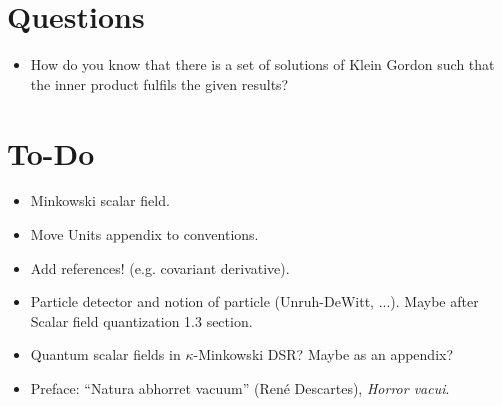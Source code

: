 \section{Questions}
\begin{itemize}
	\item How do you know that there is a set of solutions of Klein Gordon such that the inner product fulfils the given results?
\end{itemize}
\section{To-Do}
\begin{itemize}
	\item Minkowski scalar field.
	\item Move Units appendix to conventions.
	\item Add references! (e.g. covariant derivative).
	\item Particle detector and notion of particle (Unruh-DeWitt, ...). Maybe after Scalar field quantization 1.3 section.
	\item Quantum scalar fields in $\kappa$-Minkowski DSR? Maybe as an appendix? 
	\item Preface:	“Natura abhorret vacuum” (René Descartes), \textit{Horror vacui}.
\end{itemize}